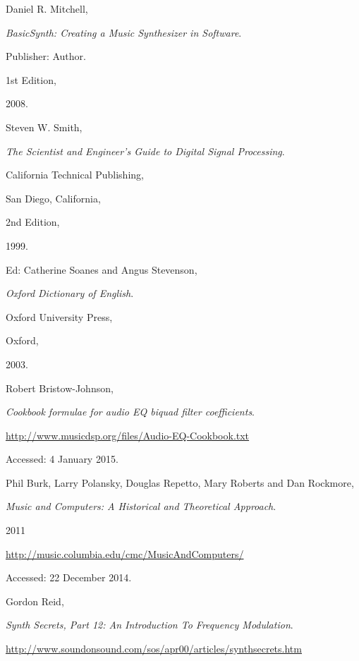 \begin{thebibliography}{99}


  Daniel R. Mitchell,

  \emph{BasicSynth: Creating a Music Synthesizer in Software}.

  Publisher: Author.

  1st Edition,

  2008.


  Steven W. Smith,

  \emph{The Scientist and Engineer's Guide to Digital Signal Processing}.

  California Technical Publishing,

  San Diego, California,

  2nd Edition,

  1999.


  Ed: Catherine Soanes and Angus Stevenson,

  \emph{Oxford Dictionary of English}.

  Oxford University Press,

  Oxford,

  2003.
  
  
  Robert Bristow-Johnson,
  
  \emph{Cookbook formulae for audio EQ biquad filter coefficients}.
  
  \url{http://www.musicdsp.org/files/Audio-EQ-Cookbook.txt}
  
  Accessed: 4 January 2015.


  Phil Burk, Larry Polansky, Douglas Repetto, Mary Roberts and Dan Rockmore,

  \emph{Music and Computers: A Historical and Theoretical Approach}.

  2011

  \url{http://music.columbia.edu/cmc/MusicAndComputers/}

  Accessed: 22 December 2014.


  Gordon Reid,

  \emph{Synth Secrets, Part 12: An Introduction To Frequency Modulation}.

  \url{http://www.soundonsound.com/sos/apr00/articles/synthsecrets.htm}


\end{thebibliography}
